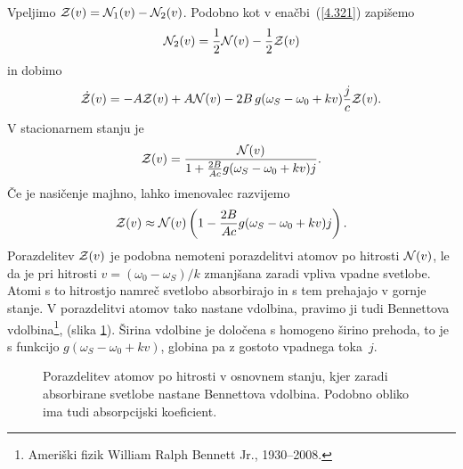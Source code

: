 Vpeljimo ${\cal Z}(v)={\cal N}_{1}(v)-{\cal N}_{2}(v)$. Podobno kot 
v enačbi~(\ref{4.321}) zapišemo
\begin{equation}
{\cal N}_{2}(v)=\frac{1}{2}{\cal N}(v)-\frac{1}{2}{\cal Z}(v)
\end{equation}
in dobimo 
\begin{equation}
\dot{{\cal Z}}(v)=-A{\cal Z}(v)+A{\cal N}(v)
-2B\,g(\omega_S-\omega_{0}+kv)\frac{j}{c}
{\cal Z}(v).
\label{4.87}
\end{equation}
V stacionarnem stanju je 
\begin{equation}
{\cal Z}(v)=\frac{{\cal N}(v)}{1+\frac{2B}{Ac}g(\omega_S-\omega_{0}+kv)j}.
\label{4.88}
\end{equation}
 Če je nasičenje majhno, lahko imenovalec razvijemo
\begin{equation}
{\cal Z}(v)\approx{\cal N}(v)\left(1-\frac{2B}{Ac}g(\omega_S-\omega_{0}+kv)j\right).
\label{4.89}
\end{equation}
Porazdelitev ${\cal Z}(v)$ je podobna nemoteni porazdelitvi atomov
po hitrosti ${\cal N}(v)$, le da je pri hitrosti $v=(\omega_{0}-\omega_S)/k$
zmanjšana zaradi vpliva vpadne svetlobe. Atomi s to hitrostjo namreč svetlobo
absorbirajo in s tem prehajajo v gornje stanje. V porazdelitvi
atomov tako nastane vdolbina, 
pravimo ji tudi Bennettova
vdolbina\footnote{Ameriški fizik William Ralph Bennett Jr., 1930--2008.}, 
(slika \ref{fig:Bennet}). Širina vdolbine je določena
s homogeno širino prehoda, to je s funkcijo $g(\omega_S-\omega_{0}+kv)$,
globina pa z gostoto vpadnega toka~$j$.
\begin{figure}[h]
\centering
\def\svgwidth{80truemm} 

\caption{Porazdelitev atomov po hitrosti v osnovnem stanju, kjer zaradi
absorbirane svetlobe nastane Bennettova vdolbina. Podobno obliko ima 
tudi absorpcijski koeficient.}
\label{fig:Bennet}
\end{figure}

